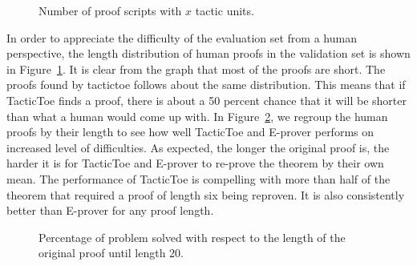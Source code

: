\documentclass[runningheads,a4paper,draft]{svjour3}
\def\eprover{\textsf{E-prover}\xspace}
\def\tactictoe{\textsf{TacticToe}\xspace}
\begin{document}
\begin{figure}[h]
\centering
{}
\caption{\label{fig:distrib}Number of proof scripts with $x$ tactic units.}
\end{figure}

In order to appreciate the difficulty of the evaluation set from a human
perspective, the length distribution of human proofs in the
validation set is shown in Figure~\ref{fig:distrib}.  It is clear from the
graph that most of the proofs are short. The proofs found by tactictoe follows
about the same
distribution. This means that if \tactictoe finds a proof, there is about a 50
percent chance that it will be shorter than what a human would come up with.
In Figure~\ref{fig:percentage}, we regroup the human proofs by their length to
see how well \tactictoe and \eprover performs on increased level of
difficulties. As expected, the longer the original proof is, the harder it is
for \tactictoe and \eprover to re-prove the theorem by their own mean.
The performance of \tactictoe is compelling with more than half of the theorem
that required a proof of length six being reproven. It is also consistently
better than \eprover for any proof length.

\begin{figure}[h]
\centering
{}
\caption{\label{fig:percentage}Percentage of problem solved with respect to the
length of the
original proof until length 20.}
\end{figure}
\end{document}
